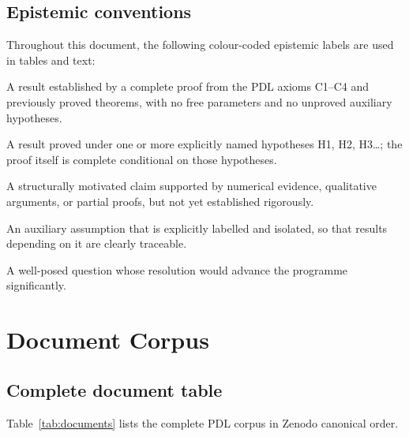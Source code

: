 \documentclass[11pt,a4paper]{article}
\theoremstyle{plain}
\theoremstyle{definition}
\theoremstyle{remark}
\begin{document}
\subsection{Epistemic conventions}
\label{subsec:conventions}
Throughout this document, the following colour-coded epistemic labels are used in tables and text:
\begin{description}[leftmargin=2.5cm, style=nextline]
\item[\textcolor{proofblue}{Theorem}] A result established by a complete proof from the PDL axioms C1--C4 and previously proved theorems, with no free parameters and no unproved auxiliary hypotheses.
\item[\textcolor{proofblue}{Theorem (H$x$)}] A result proved under one or more explicitly named hypotheses H1, H2, H3\ldots; the proof itself is complete conditional on those hypotheses.
\item[\textcolor{conjecturegreen}{Conjecture}] A structurally motivated claim supported by numerical evidence, qualitative arguments, or partial proofs, but not yet established rigorously.
\item[\textcolor{hypothesisorange}{Named Hypothesis}] An auxiliary assumption that is explicitly labelled and isolated, so that results depending on it are clearly traceable.
\item[\textcolor{openproblemred}{Open Problem}] A well-posed question whose resolution would advance the programme significantly.
\end{description}

\section{Document Corpus}
\label{sec:corpus}

\subsection{Complete document table}
\label{subsec:doctable}
Table~\ref{tab:documents} lists the complete PDL corpus in Zenodo canonical order.
\end{document}
